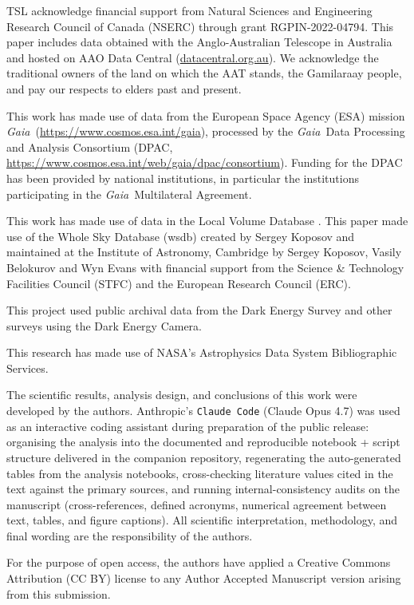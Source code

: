 \documentclass[twocolumn]{aastex631}
\newcommand{\gaia}{\textit{Gaia}\xspace}
\begin{document}
\begin{acknowledgments}
TSL acknowledge financial support from Natural Sciences and Engineering Research Council of Canada (NSERC) through grant RGPIN-2022-04794.
This paper includes data obtained with the Anglo-Australian Telescope in Australia and hosted on AAO Data Central (\url{datacentral.org.au}). We acknowledge the traditional owners of the land on which the AAT stands, the Gamilaraay people, and pay our respects to elders past and present.

This work has made use of data from the European Space Agency (ESA) mission \gaia\ (\url{https://www.cosmos.esa.int/gaia}), processed by the \gaia\ Data Processing and Analysis Consortium (DPAC, \url{https://www.cosmos.esa.int/web/gaia/dpac/consortium}). Funding for the DPAC has been provided by national institutions, in particular the institutions participating in the \gaia\ Multilateral Agreement.

This work has made use of data in the Local Volume Database \citep{Pace2025}.
This paper made use of the Whole Sky Database (wsdb) created by Sergey Koposov and maintained at the Institute of Astronomy, Cambridge by Sergey Koposov, Vasily Belokurov and Wyn Evans with financial support from the Science \& Technology Facilities Council (STFC) and the European Research Council (ERC).

This project used public archival data from the Dark Energy Survey and other surveys using the Dark Energy Camera.

This research has made use of NASA's Astrophysics Data System Bibliographic Services.

The scientific results, analysis design, and conclusions of this work were developed by the authors.  Anthropic's \texttt{Claude Code} (Claude Opus 4.7) was used as an interactive coding assistant during preparation of the public release: organising the analysis into the documented and reproducible notebook + script structure delivered in the companion repository, regenerating the auto-generated tables from the analysis notebooks, cross-checking literature values cited in the text against the primary sources, and running internal-consistency audits on the manuscript (cross-references, defined acronyms, numerical agreement between text, tables, and figure captions).  All scientific interpretation, methodology, and final wording are the responsibility of the authors.

For the purpose of open access, the authors have applied a Creative Commons Attribution (CC BY) license to any Author Accepted Manuscript version arising from this submission.
\end{acknowledgments}
\end{document}
